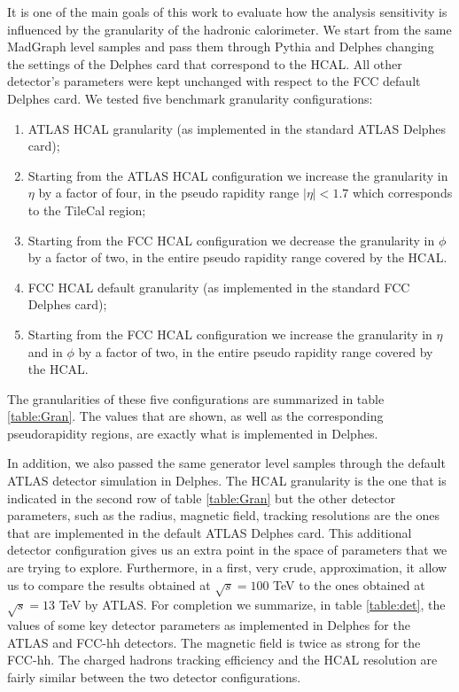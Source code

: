 It is one of the main goals of this work to evaluate how the analysis sensitivity is influenced by the granularity of the hadronic calorimeter. We start from the same MadGraph level samples and pass them through Pythia and Delphes changing the settings of the Delphes card that correspond to the HCAL. All other detector's parameters were kept unchanged with respect to the FCC default Delphes card. 
We tested five benchmark granularity configurations:

\begin{enumerate}
	\item ATLAS HCAL granularity (as implemented in the standard ATLAS Delphes card);
	\item Starting from the ATLAS HCAL configuration we increase the granularity in $\eta$ by a factor of four, in the pseudo rapidity range $|\eta|<1.7$ which corresponds to the TileCal region;
	\item Starting from the FCC HCAL configuration we decrease the granularity in $\phi$ by a factor of two, in the entire pseudo rapidity range covered by the HCAL.
	\item FCC HCAL default granularity (as implemented in the standard FCC Delphes card);
	\item Starting from the FCC HCAL configuration we increase the granularity in $\eta$ and in $\phi$ by a factor of two, in the entire pseudo rapidity range covered by the HCAL.
\end{enumerate}

The granularities of these five configurations are summarized in table \ref{table:Gran}. The values that are shown, as well as the corresponding pseudorapidity regions, are exactly what is implemented in Delphes. 

In addition, we also passed the same generator level samples through the default ATLAS detector simulation in Delphes. The HCAL granularity is the one that is indicated in the second row of table \ref{table:Gran} but the other detector parameters, such as the radius, magnetic field, tracking resolutions are the ones that are implemented in the default ATLAS Delphes card. This additional detector configuration gives us an extra point in the space of parameters that we are trying to explore. Furthermore, in a first, very crude, approximation, it allow us to compare the results obtained at $\sqrt{s}=100$ TeV to the ones obtained at $\sqrt{s}=13$ TeV by ATLAS.
For completion we summarize, in table \ref{table:det}, the values of some key detector parameters as implemented in Delphes for the ATLAS and FCC-hh detectors. The magnetic field is twice as strong for the FCC-hh. The charged hadrons tracking efficiency and the HCAL resolution are fairly similar between the two detector configurations.

